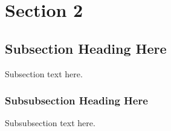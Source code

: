\section{Section 2}


\subsection{Subsection Heading Here}
Subsection text here.


\subsubsection{Subsubsection Heading Here}
Subsubsection text here.